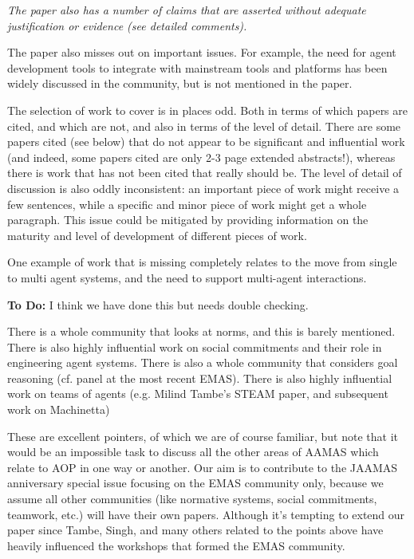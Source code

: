 \documentclass[12pt]{article}
\newenvironment{reviews}{\bigskip\itshape}{\upshape\bigskip}
\newenvironment{response}{\bigskip\normalfont}{\bigskip}
\newcommand{\tbd}[1]{\textsf{\textbf{To Do:} #1}}
\begin{document}
\begin{reviews}
The paper also has a number of claims that are asserted without adequate justification or evidence (see detailed comments).

The paper also misses out on important issues. For example, the need for agent development tools to integrate with mainstream tools and platforms has been widely discussed in the community, but is not mentioned in the paper. 

The selection of work to cover is in places odd. Both in terms of which papers are cited, and which are not, and also in terms of the level of detail. There are some papers cited (see below) that do not appear to be significant and influential work (and indeed, some papers cited are only 2-3 page extended abstracts!), whereas there is work that has not been cited that really should be. The level of detail of discussion is also oddly inconsistent: an important piece of work might receive a few sentences, while a specific and minor piece of work might get a whole paragraph. This issue could be mitigated by providing information on the maturity and level of development of different pieces of work. 

One example of work that is missing completely relates to the move from single to multi agent systems, and the need to support multi-agent interactions. 

\begin{response}
\tbd{I think we have done this but needs double checking.}
\end{response}

There is a whole community that looks at norms, and this is barely mentioned. There is also highly influential work on social commitments and their role in engineering agent systems. There is also a whole community that considers goal reasoning (cf. panel at the most recent EMAS).  There is also highly influential work on teams of agents (e.g. Milind Tambe's STEAM paper, and subsequent work on Machinetta)

\begin{response}
These are excellent pointers, of which we are of course familiar, but note that it would be an impossible task to discuss all the other areas of AAMAS which relate to AOP in one way or another. Our aim is to contribute to the JAAMAS anniversary special issue focusing on the EMAS community only, because we assume all other communities (like normative systems, social commitments, teamwork, etc.) will have their own papers. Although it's tempting to extend our paper since Tambe, Singh, and many others related to the points above have heavily influenced the workshops that formed the EMAS community.
\end{response}


\end{reviews}
\end{document}
